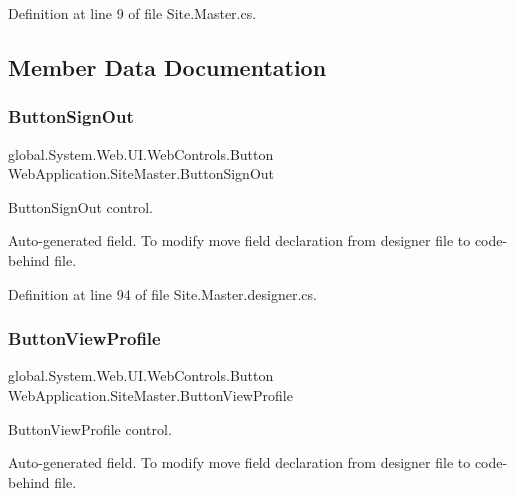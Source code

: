 Definition at line 9 of file Site.\+Master.\+cs.



\subsection{Member Data Documentation}
\mbox{\label{classWebApplication_1_1SiteMaster_aca81d110c413a44742be7fcd2c464cdc}} 
\subsubsection{\texorpdfstring{ButtonSignOut}{ButtonSignOut}}
{\footnotesize\ttfamily global.\+System.\+Web.\+U\+I.\+Web\+Controls.\+Button Web\+Application.\+Site\+Master.\+Button\+Sign\+Out\hspace{0.3cm}{\ttfamily [protected]}}



Button\+Sign\+Out control. 

Auto-\/generated field. To modify move field declaration from designer file to code-\/behind file. 

Definition at line 94 of file Site.\+Master.\+designer.\+cs.

\mbox{\label{classWebApplication_1_1SiteMaster_a0977d0b502832c397e8672dead732892}} 
\subsubsection{\texorpdfstring{ButtonViewProfile}{ButtonViewProfile}}
{\footnotesize\ttfamily global.\+System.\+Web.\+U\+I.\+Web\+Controls.\+Button Web\+Application.\+Site\+Master.\+Button\+View\+Profile\hspace{0.3cm}{\ttfamily [protected]}}



Button\+View\+Profile control. 

Auto-\/generated field. To modify move field declaration from designer file to code-\/behind file. 

